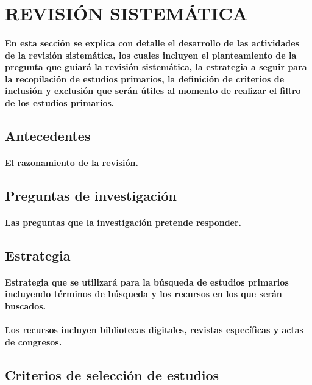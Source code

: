 \documentclass[10pt, twocolumn]{article}
\begin{document}
\section{REVISIÓN SISTEMÁTICA}
\paragraph{En esta sección se explica con detalle el desarrollo de las actividades de la revisión sistemática, los cuales incluyen el planteamiento de la pregunta que guiará la revisión sistemática, la estrategia a seguir para la recopilación de estudios primarios, la definición de criterios de inclusión y exclusión que serán útiles al momento de realizar el filtro de los estudios primarios.}

\subsection{Antecedentes}
\paragraph{El razonamiento de la revisión.}

\subsection{Preguntas de investigación}
\paragraph{Las preguntas que la investigación pretende responder.}

\subsection{Estrategia}
\paragraph{Estrategia que se utilizará para la búsqueda de estudios primarios incluyendo términos de búsqueda y los recursos en los que serán buscados.}
\paragraph{Los recursos incluyen bibliotecas digitales, revistas específicas y actas de congresos.}

\subsection{Criterios de selección de estudios}
\end{document}
